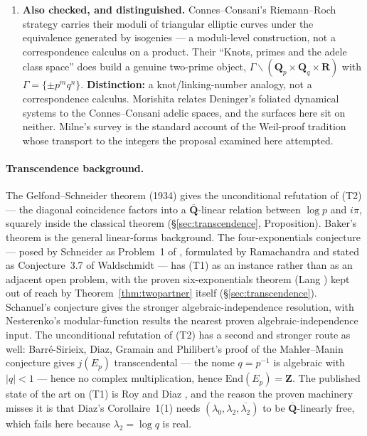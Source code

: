 \documentclass[11pt]{article}
\theoremstyle{definition}
\theoremstyle{remark}
\newcommand{\Z}{\mathbf{Z}}
\newcommand{\Q}{\mathbf{Q}}
\newcommand{\R}{\mathbf{R}}
\newcommand{\C}{\mathbf{C}}
\newcommand{\Hom}{\mathrm{Hom}}
\newcommand{\End}{\mathrm{End}}
\begin{document}
\begin{enumerate}
concludes that each curve in his family has at most one isogenous partner. That
is \S\S\ref{sec:isogeny}--\ref{sec:familykill} of this paper, transported.
\textbf{Distinction:} his context is the geometry of $\mathrm{SL}_2(\C)/\Gamma$
and hyperbolic geodesic length spectra; he never takes $\lambda$ prime, never
writes $\Hom$, never computes a rank or an isogeny degree, and raises no
N\'eron--Severi group, no correspondence calculus and no explicit formula. What
this paper adds is the prime-indexed explication and the no-go.
\item \textbf{Also checked, and distinguished.} Connes--Consani's Riemann--Roch
strategy \cite[\S\S6.4--6.6]{CC19} carries their moduli of triangular elliptic
curves under the equivalence generated by isogenies --- a moduli-level
construction, not a correspondence calculus on a product. Their ``Knots, primes
and the adele class space'' \cite[\S3]{CC24a} does build a genuine two-prime
object, $\Gamma \backslash (\Q_p \times \Q_q \times \R)$ with
$\Gamma = \{\pm p^m q^n\}$. \textbf{Distinction:} a knot/linking-number
analogy, not a correspondence calculus. Morishita \cite{Mor25} relates
Deninger's foliated dynamical systems to the Connes--Consani adelic spaces, and
the surfaces here sit on neither. Milne's survey \cite{Mil16} is the standard
account of the Weil-proof tradition whose transport to the integers the
proposal examined here attempted.
\end{enumerate}

\paragraph{Transcendence background.}
The Gelfond--Schneider theorem (1934) gives the unconditional refutation of
(T2) --- the diagonal coincidence factors into a
$\overline{\Q}$-linear relation between $\log p$ and $i\pi$, squarely inside
the classical theorem (\S\ref{sec:transcendence}, Proposition). Baker's
theorem is the general linear-forms background. The four-exponentials
conjecture \cite{FourExp} --- posed by Schneider as Problem~1 of
\cite[Ch.~V, \S4]{Sch57}, formulated by Ramachandra \cite[II, \S4]{Ram68} and
stated as Conjecture~3.7 of Waldschmidt \cite{Wal04} --- has (T1) as an
instance rather than as an adjacent open problem, with the proven
six-exponentials theorem (Lang \cite{Lan66}) kept out of reach by
Theorem~\ref{thm:twopartner} itself (\S\ref{sec:transcendence}). Schanuel's
conjecture gives the stronger algebraic-independence resolution, with
Nesterenko's modular-function results \cite{Nes96} the nearest proven
algebraic-independence input. The unconditional refutation of (T2) has a
second and stronger route as well: Barr\'e-Sirieix, Diaz, Gramain and
Philibert's proof of the Mahler--Manin conjecture \cite{BDGP96} gives $j(E_p)$
transcendental --- the nome $q = p^{-1}$ is algebraic with $|q| < 1$ --- hence
no complex multiplication, hence $\End(E_p) = \Z$. The published state of the
art on (T1) is Roy \cite{Roy92} and Diaz \cite{Dia07}, and the reason the
proven machinery misses it is that Diaz's Corollaire~1(1) needs
$(\lambda_0, \lambda_2, \overline{\lambda_2})$ to be $\overline{\Q}$-linearly
free, which fails here because $\lambda_2 = \log q$ is real.
\end{document}
